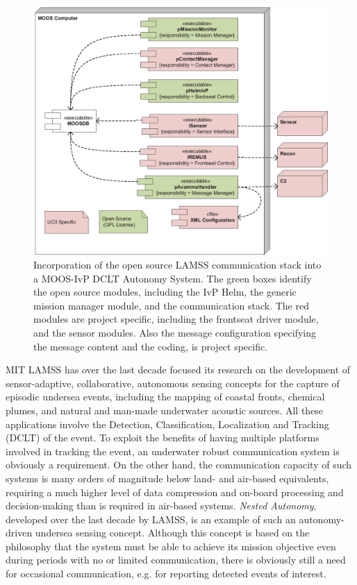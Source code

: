 \documentclass[11pt, letterpaper, oneside]{memoir}
\begin{document}
\begin{figure}[tp]
  \centering 
  \includegraphics[width=\textwidth]{dclt_component.eps}
\caption{Incorporation of the open source LAMSS communication stack into
 a MOOS-IvP DCLT Autonomy System. The green boxes identify the
 open source modules, including the IvP Helm, the generic mission
 manager module, and the communication stack. The red modules are
 project specific, including the frontseat driver module, and the
 sensor modules. Also the message configuration specifying the message
 content and the coding, is project specific. \label{lamss_dclt}} 
\end{figure}

MIT LAMSS has over the last decade focused its research on the
development of sensor-adaptive, collaborative, autonomous sensing
concepts for the capture of episodic undersea events, including the
mapping of coastal fronts, chemical plumes, and natural and man-made
underwater acoustic sources. All these applications involve the
Detection, Classification, Localization and Tracking (DCLT) of the
event. To exploit the benefits of having multiple platforms involved
in tracking the event, an underwater robust communication system is
obviously a requirement. On the other hand, the communication capacity
of such systems is many orders of magnitude below land- and air-based
equivalents, requiring a much higher level of data compression and
on-board processing and decision-making than is required in air-based
systems. {\em Nested Autonomy}, developed over the
last decade by LAMSS, is an example of such an autonomy-driven
undersea sensing concept. Although this concept is based on the
philosophy that the system must be able to achieve its mission
objective even during periods with no or limited communication, there
is obviously still a need for occasional communication, e.g. for
reporting detected events of interest.
\end{document}
